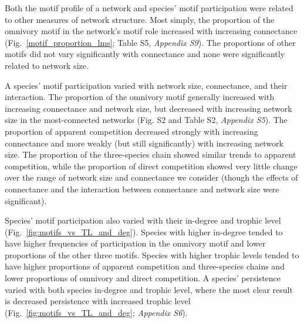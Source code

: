 \documentclass[12pt]{article}
\begin{document}
\begin{spacing}{2.0}
        Both the motif profile of a network and species' motif participation were related to other measures of network structure.
        Most simply, the proportion of the omnivory motif in the network's motif role increased with increasing connectance (Fig.~\ref{motif_proportion_lms}; Table S5, \emph{Appendix S9}).
        The proportions of other motifs did not vary significantly with connectance and none were significantly related to network size.


        A species' motif participation varied with network size, connectance, and their interaction. 
        The proportion of the omnivory motif generally increased with increasing connectance and network size, but decreased with increasing network size in the most-connected networks (Fig. S2 and Table S2, \emph{Appendix S5}).
        The proportion of apparent competition decreased strongly with increasing connectance and more weakly (but still significantly) with increasing network size.
        The proportion of the three-species chain showed similar trends to apparent competition, while the proportion of direct competition showed very little change over the range of network size and connectance we consider (though the effects of connectance and the interaction between connectance and network size were significant).

        
        Species' motif participation also varied with their in-degree and trophic level (Fig.~\ref{fig:motifs_vs_TL_and_deg}).
        Species with higher in-degree tended to have higher frequencies of participation in the omnivory motif and lower proportions of the other three motifs.
        Species with higher trophic levels tended to have higher proportions of apparent competition and three-species chains and lower proportions of omnivory and direct competition. 
        A species' persistence varied with both species in-degree and trophic level, where the most clear result is decreased persistence with increased trophic level (Fig.~\ref{fig:motifs_vs_TL_and_deg}; \emph{Appendix S6}). 
        
        
    

\end{spacing}
\end{document}
